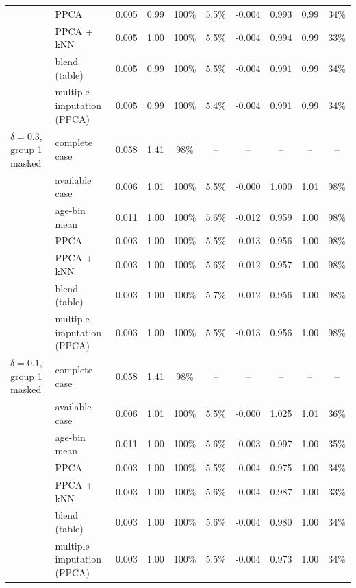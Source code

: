 \begin{tabular}{llcccccccc}
 & PPCA & 0.005 & 0.99 & 100\% & 5.5\% & -0.004 & 0.993 & 0.99 & 34\% \\
 & PPCA + kNN & 0.005 & 1.00 & 100\% & 5.5\% & -0.004 & 0.994 & 0.99 & 33\% \\
 & blend (table) & 0.005 & 0.99 & 100\% & 5.5\% & -0.004 & 0.991 & 0.99 & 34\% \\
 & multiple imputation (PPCA) & 0.005 & 0.99 & 100\% & 5.4\% & -0.004 & 0.991 & 0.99 & 34\% \\
\addlinespace[2pt]
$\delta=0.3$, group 1 masked & complete case & 0.058 & 1.41 & 98\% & -- & -- & -- & -- & -- \\
 & available case & 0.006 & 1.01 & 100\% & 5.5\% & -0.000 & 1.000 & 1.01 & 98\% \\
 & age-bin mean & 0.011 & 1.00 & 100\% & 5.6\% & -0.012 & 0.959 & 1.00 & 98\% \\
 & PPCA & 0.003 & 1.00 & 100\% & 5.5\% & -0.013 & 0.956 & 1.00 & 98\% \\
 & PPCA + kNN & 0.003 & 1.00 & 100\% & 5.6\% & -0.012 & 0.957 & 1.00 & 98\% \\
 & blend (table) & 0.003 & 1.00 & 100\% & 5.7\% & -0.012 & 0.956 & 1.00 & 98\% \\
 & multiple imputation (PPCA) & 0.003 & 1.00 & 100\% & 5.5\% & -0.013 & 0.956 & 1.00 & 98\% \\
\addlinespace[2pt]
$\delta=0.1$, group 1 masked & complete case & 0.058 & 1.41 & 98\% & -- & -- & -- & -- & -- \\
 & available case & 0.006 & 1.01 & 100\% & 5.5\% & -0.000 & 1.025 & 1.01 & 36\% \\
 & age-bin mean & 0.011 & 1.00 & 100\% & 5.6\% & -0.003 & 0.997 & 1.00 & 35\% \\
 & PPCA & 0.003 & 1.00 & 100\% & 5.5\% & -0.004 & 0.975 & 1.00 & 34\% \\
 & PPCA + kNN & 0.003 & 1.00 & 100\% & 5.6\% & -0.004 & 0.987 & 1.00 & 33\% \\
 & blend (table) & 0.003 & 1.00 & 100\% & 5.6\% & -0.004 & 0.980 & 1.00 & 34\% \\
 & multiple imputation (PPCA) & 0.003 & 1.00 & 100\% & 5.5\% & -0.004 & 0.973 & 1.00 & 34\% \\
\bottomrule
\end{tabular}
